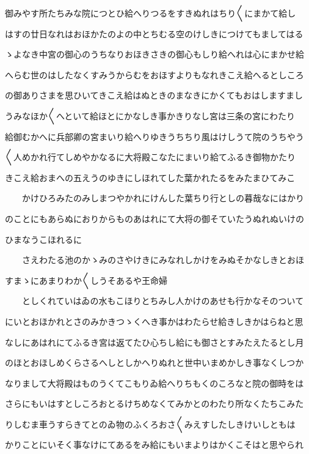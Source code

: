 \documentclass[a4paper,11pt,landscape]{ltjtarticle}
\begin{document}
御みやす所たちみな院につとひ給へりつるをすきぬれはちり〱にまかて給し
\par\medskip
はすの廿日なれはおほかたのよの中とちむる空のけしきにつけてもましてはる
\par\medskip
ゝよなき中宮の御心のうちなりおほきさきの御心もしり給へれは心にまかせ給
\par\medskip
へらむ世のはしたなくすみうからむをおほすよりもなれきこえ給へるとしころ
\par\medskip
の御ありさまを思ひいてきこえ給はぬときのまなきにかくてもおはしますまし
\par\medskip
うみなほか〱へといて給ほとにかなしき事かきりなし宮は三条の宮にわたり
\par\medskip
給御むかへに兵部卿の宮まいり給へりゆきうちちり風はけしうて院のうちやう
\par\medskip
〱人めかれ行てしめやかなるに大将殿こなたにまいり給てふるき御物かたり
\par\medskip
きこえ給おまへの五えうのゆきにしほれてした葉かれたるをみたまひてみこ
\par\medskip
　　かけひろみたのみしまつやかれにけんした葉ちり行としの暮哉なにはかり
\par\medskip
のことにもあらぬにおりからものあはれにて大将の御そていたうぬれぬいけの
\par\medskip
ひまなうこほれるに
\par\medskip
　　さえわたる池のかゝみのさやけきにみなれしかけをみぬそかなしきとおほ
\par\medskip
すまゝにあまりわか〱しうそあるや王命婦
\par\medskip
　　としくれていはゐの水もこほりとちみし人かけのあせも行かなそのついて
\par\medskip
にいとおほかれとさのみかきつゝくへき事かはわたらせ給きしきかはらねと思
\par\medskip
なしにあはれにてふるき宮は返てたひ心ちし給にも御さとすみたえたるとし月
\par\medskip
のほとおほしめくらさるへしとしかへりぬれと世中いまめかしき事なくしつか
\par\medskip
なりまして大将殿はものうくてこもりゐ給へりちもくのころなと院の御時をは
\par\medskip
さらにもいはすとしころおとるけちめなくてみかとのわたり所なくたちこみた
\par\medskip
りしむま車うすらきてとのゐ物のふくろおさ〱みえすしたしきけいしともは
\par\medskip
かりことにいそく事なけにてあるをみ給にもいまよりはかくこそはと思やられ
\par\medskip
\end{document}
